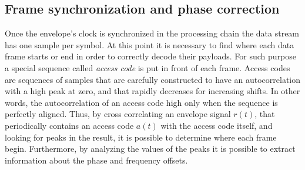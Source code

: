 

\subsection{Frame synchronization and phase correction} \label{sec:phasecorr}

Once the envelope's clock is synchronized in the processing chain the data stream has one sample per symbol. At this point it is necessary to find where each data frame starts or end in order to correctly decode their payloads. For such purpose a special sequence called \emph{access code} is put in front of each frame. Access codes are sequences of samples that are carefully constructed to have an autocorrelation with a high peak at zero, and that rapidly decreases for increasing shifts. In other words, the autocorrelation of an access code high only when the sequence is perfectly aligned. Thus, by cross correlating an envelope signal \(r(t)\), that periodically contains an access code \(a(t)\) with the access code itself, and looking for peaks in the result, it is possible to determine where each frame begin. Furthermore, by analyzing the values of the peaks it is possible to extract information about the phase and frequency offsets.

